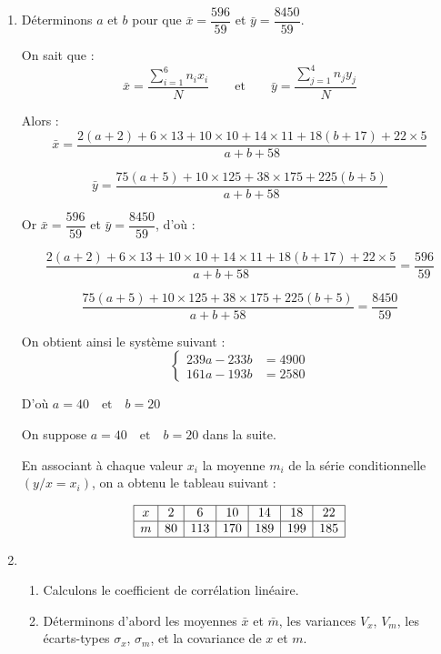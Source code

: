 \documentclass[12pt,a4paper]{article}
\begin{document}
\begin{enumerate}
    \item Déterminons \( a \) et \( b \) pour que \( \bar{x} = \dfrac{596}{59} \) et \( \bar{y} = \dfrac{8450}{59} \).

\vspace{0.3cm}

On sait que : 
\[
\bar{x} = \frac{\sum\limits_{i=1}^6 n_i x_i}{N} 
\qquad \text{et} \qquad 
\bar{y} = \frac{\sum\limits_{j=1}^4 n_j y_j}{N}
\]

\vspace{0.3cm}

Alors :
\[
\bar{x} = \frac{2(a+2) + 6 \times 13 + 10 \times 10 + 14 \times 11 + 18(b+17) + 22 \times 5}{a + b + 58}
\]

\[
\bar{y} = \frac{75(a+5) + 10 \times 125 + 38 \times 175 + 225(b+5)}{a + b + 58}
\]

\vspace{0.2cm}
Or \( \bar{x} = \dfrac{596}{59} \) et \( \bar{y} = \dfrac{8450}{59} \), d’où :

\[
\frac{2(a+2) + 6 \times 13 + 10 \times 10 + 14 \times 11 + 18(b+17) + 22 \times 5}{a + b + 58} = \frac{596}{59}
\]

\[
\frac{75(a+5) + 10 \times 125 + 38 \times 175 + 225(b+5)}{a + b + 58} = \frac{8450}{59}
\]

\vspace{0.2cm}
On obtient ainsi le système suivant :
\[
\left\{
\begin{aligned}
239a - 233b &= 4900 \\
161a - 193b &= 2580
\end{aligned}
\right.
\]

\vspace{0.2cm}
D'où \( a = 40 \quad \text{et} \quad b = 20 \)

\vspace{0.4cm}
On suppose \( a = 40 \quad \text{et} \quad b = 20 \) dans la suite.

En associant à chaque valeur \( x_i \) la moyenne \( m_i \) de la série conditionnelle \( (y/x = x_i) \), on a obtenu le tableau suivant :

\vspace{0.3cm}

\[
\begin{array}{|c|c|c|c|c|c|c|}
\hline
x & 2 & 6 & 10 & 14 & 18 & 22 \\
\hline
m & 80 & 113 & 170 & 189 & 199 & 185 \\
\hline
\end{array}
\]
\item 
\begin{enumerate}
  \item Calculons le coefficient de corrélation linéaire.
    \item Déterminons d'abord les moyennes \( \bar{x} \) et \( \bar{m} \), les variances \( V_x \), \( V_m \), les écarts-types \( \sigma_x \), \( \sigma_m \), et la covariance de \( x \) et \( m \).


\end{enumerate}
\end{enumerate}
\end{document}
